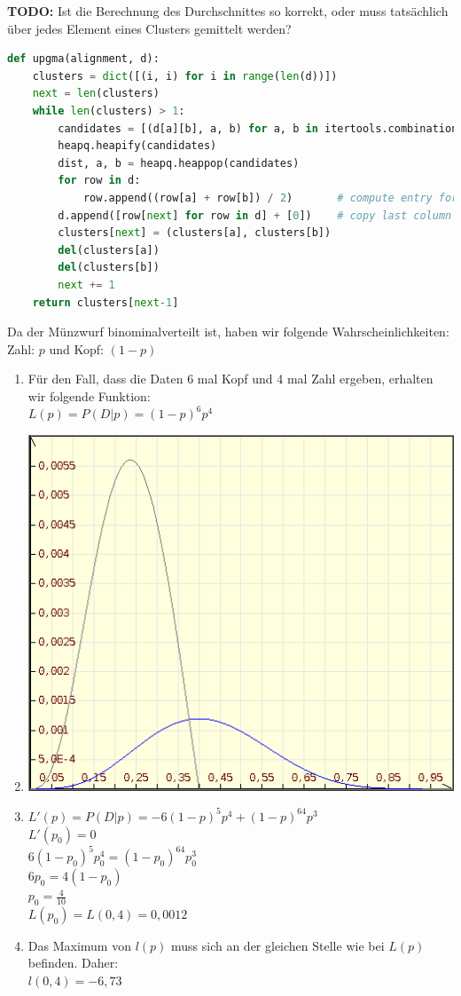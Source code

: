 \documentclass{homework}
\begin{document}
\begin{enumerate}
\begin{enumerate}
\textbf{TODO:} Ist die Berechnung des Durchschnittes so korrekt, oder muss
tatsächlich über jedes Element eines Clusters gemittelt werden?

\begin{lstlisting}[language=python]
def upgma(alignment, d):
	clusters = dict([(i, i) for i in range(len(d))])
	next = len(clusters)
	while len(clusters) > 1:
		candidates = [(d[a][b], a, b) for a, b in itertools.combinations(clusters.keys(), 2)]
		heapq.heapify(candidates)
		dist, a, b = heapq.heappop(candidates)
		for row in d:
			row.append((row[a] + row[b]) / 2)		# compute entry for new column
		d.append([row[next] for row in d] + [0])	# copy last column to new row
		clusters[next] = (clusters[a], clusters[b])
		del(clusters[a])
		del(clusters[b])
		next += 1
	return clusters[next-1]
\end{lstlisting}

\end{enumerate}

Da der Münzwurf binominalverteilt ist, haben wir folgende Wahrscheinlichkeiten:\\
Zahl: $p$ und Kopf: $(1-p)$ 
\begin{enumerate}
\item
	Für den Fall, dass die Daten 6 mal Kopf und 4 mal Zahl ergeben, erhalten wir folgende Funktion:\\
	$L(p) = P(D|p) = (1-p)^6p^4$
\item
	\includegraphics[scale=0.3]{u3_aufg4b.png} 
\item
	$L'(p) = P(D|p) = -6(1-p)^5p^4+(1-p)^64p^3$\\
	$L'(p_0) = 0$\\
	$6(1-p_0)^5p_0^4 = (1-p_0)^64p_0^3$\\
	$6p_0 = 4(1-p_0)$\\
	$p_0 = \frac{4}{10}$\\
	$L(p_0) = L(0,4) = 0,0012$\\
\item
	Das Maximum von $l(p)$ muss sich an der gleichen Stelle wie bei $L(p)$ befinden. Daher: \\
	$l(0,4) = -6,73$
	

\end{enumerate}
\end{enumerate}
\end{document}

